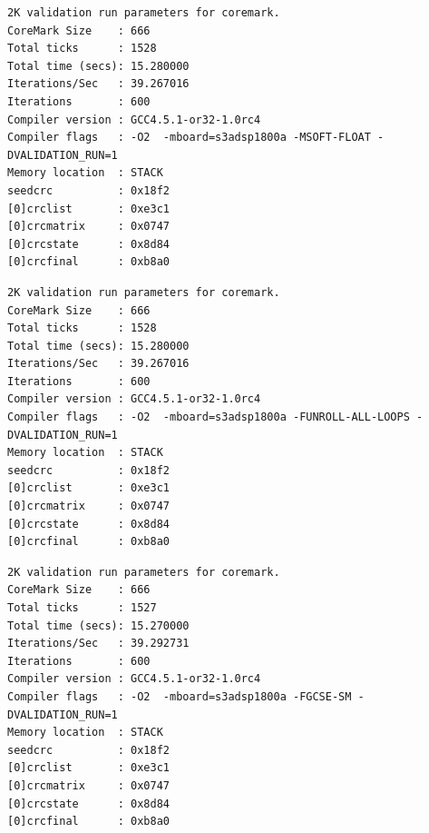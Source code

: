 \begin{lstlisting}[frame=single,caption={Optimización nivel -O2},label={lst:salidas},breaklines]
2K validation run parameters for coremark.
CoreMark Size    : 666
Total ticks      : 1528
Total time (secs): 15.280000
Iterations/Sec   : 39.267016
Iterations       : 600
Compiler version : GCC4.5.1-or32-1.0rc4
Compiler flags   : -O2  -mboard=s3adsp1800a -MSOFT-FLOAT -DVALIDATION_RUN=1  
Memory location  : STACK
seedcrc          : 0x18f2
[0]crclist       : 0xe3c1
[0]crcmatrix     : 0x0747
[0]crcstate      : 0x8d84
[0]crcfinal      : 0xb8a0
\end{lstlisting}

\begin{lstlisting}[frame=single,caption={Optimización nivel -O2},label={lst:salidas},breaklines]
2K validation run parameters for coremark.
CoreMark Size    : 666
Total ticks      : 1528
Total time (secs): 15.280000
Iterations/Sec   : 39.267016
Iterations       : 600
Compiler version : GCC4.5.1-or32-1.0rc4
Compiler flags   : -O2  -mboard=s3adsp1800a -FUNROLL-ALL-LOOPS -DVALIDATION_RUN=1  
Memory location  : STACK
seedcrc          : 0x18f2
[0]crclist       : 0xe3c1
[0]crcmatrix     : 0x0747
[0]crcstate      : 0x8d84
[0]crcfinal      : 0xb8a0
\end{lstlisting}

\begin{lstlisting}[frame=single,caption={Optimización nivel -O2},label={lst:salidas},breaklines]
2K validation run parameters for coremark.
CoreMark Size    : 666
Total ticks      : 1527
Total time (secs): 15.270000
Iterations/Sec   : 39.292731
Iterations       : 600
Compiler version : GCC4.5.1-or32-1.0rc4
Compiler flags   : -O2  -mboard=s3adsp1800a -FGCSE-SM -DVALIDATION_RUN=1  
Memory location  : STACK
seedcrc          : 0x18f2
[0]crclist       : 0xe3c1
[0]crcmatrix     : 0x0747
[0]crcstate      : 0x8d84
[0]crcfinal      : 0xb8a0
\end{lstlisting}

